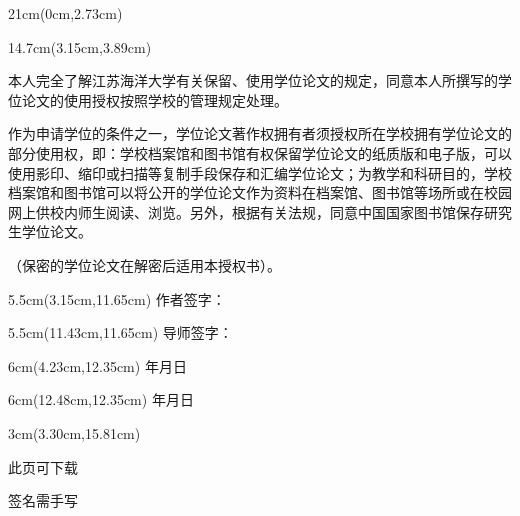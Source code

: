 \begin{titlepage}
    \thispagestyle{empty}
    \label{page:authorization}
    \null

\begin{textblock*}{21cm}(0cm,2.73cm)
\end{textblock*}

\begin{textblock*}{14.7cm}(3.15cm,3.89cm)
    {\kaishu\fontsize{12pt}{20pt}\selectfont
    \setlength{\parindent}{2em}
    本人完全了解江苏海洋大学有关保留、使用学位论文的规定，同意本人所撰写的学位论文的使用授权按照学校的管理规定处理。

    作为申请学位的条件之一，学位论文著作权拥有者须授权所在学校拥有学位论文的部分使用权，即：学校档案馆和图书馆有权保留学位论文的纸质版和电子版，可以使用影印、缩印或扫描等复制手段保存和汇编学位论文；为教学和科研目的，学校档案馆和图书馆可以将公开的学位论文作为资料在档案馆、图书馆等场所或在校园网上供校内师生阅读、浏览。另外，根据有关法规，同意中国国家图书馆保存研究生学位论文。

    （保密的学位论文在解密后适用本授权书）。
    }
\end{textblock*}

\begin{textblock*}{5.5cm}(3.15cm,11.65cm)
    {\songti{}作者签字：}
\end{textblock*}
\begin{textblock*}{5.5cm}(11.43cm,11.65cm)
    {\songti{}导师签字：}
\end{textblock*}

\begin{textblock*}{6cm}(4.23cm,12.35cm)
    {\songti{}年\hspace{1.5cm}月\hspace{1.5cm}日}
\end{textblock*}
\begin{textblock*}{6cm}(12.48cm,12.35cm)
    {\songti{}年\hspace{1.5cm}月\hspace{1.5cm}日}
\end{textblock*}

\begin{textblock*}{3cm}(3.30cm,15.81cm)
    {此页可下载\par 签名需手写}
\end{textblock*}
\vfill\null
\end{titlepage}
